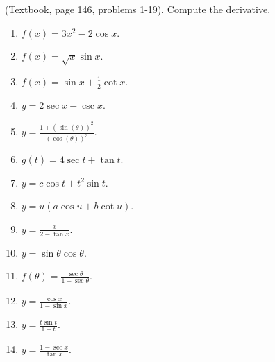 
\begin{problem}(Textbook, page 146, problems 1-19).
Compute the derivative.
\begin{multicols}{2}
\begin{enumerate}
\item $f(x)= 3x^2 -2 \cos x$.

\item $f(x)=\sqrt{x}\sin x$.

\item $f(x)=\sin x +\frac{1}{2}\cot x$.

\item $y=2\sec x - \csc x$.

\item $y=\frac{1+(\sin{}(\theta))^{2}}{(\cos{}(\theta))^{3}}$.

\item $g(t)=4 \sec t + \tan t$.

\item $y= c\cos t + t^2\sin t$.

\item $y=u(a\cos u + b \cot u)$.

\item $y=\frac{x}{2-\tan x}$.

\item $y=\sin \theta \cos \theta$.

\item $f(\theta)=\frac{\sec \theta}{1+\sec \theta}$.

\item $y=\frac{\cos x}{1-\sin x}$.

\item $y=\frac{t\sin t}{1+t}$.

\item $y=\frac{1-\sec x}{\tan x}$.


\end{enumerate}
\end{multicols}
\end{problem}
